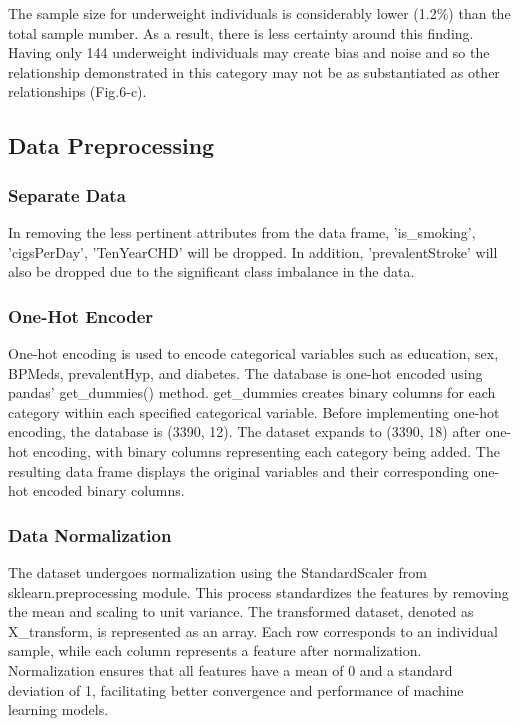 \documentclass[conference]{IEEEtran}
\begin{document}
The sample size for underweight individuals is considerably lower (1.2\%) than the total sample number. As a result, there is less certainty around this finding. Having only 144 underweight individuals may create bias and noise and so the relationship demonstrated in this category may not be as substantiated as other relationships (Fig.6-c).

\subsection{Data Preprocessing}
\subsubsection{Separate Data}
In removing the less pertinent attributes from the data frame, 'is\_smoking', 'cigsPerDay', 'TenYearCHD' will be dropped. In addition, 'prevalentStroke' will also be dropped due to the significant class imbalance in the data.  

\subsubsection{One-Hot Encoder}
One-hot encoding is used to encode categorical variables such as education, sex, BPMeds, prevalentHyp, and diabetes. The database is one-hot encoded using pandas' get\_dummies() method. get\_dummies creates binary columns for each category within each specified categorical variable. Before implementing one-hot encoding, the database is (3390, 12). The dataset expands to (3390, 18) after one-hot encoding, with binary columns representing each category being added. The resulting data frame displays the original variables and their corresponding one-hot encoded binary columns.

\subsubsection{Data Normalization}
The dataset undergoes normalization using the StandardScaler from sklearn.preprocessing module. This process standardizes the features by removing the mean and scaling to unit variance. The transformed dataset, denoted as X\_transform, is represented as an array. Each row corresponds to an individual sample, while each column represents a feature after normalization. Normalization ensures that all features have a mean of 0 and a standard deviation of 1, facilitating better convergence and performance of machine learning models.
\end{document}
